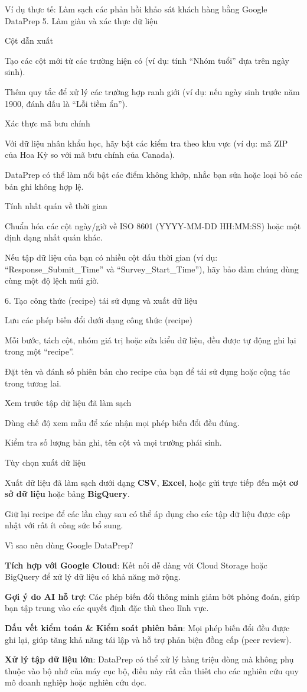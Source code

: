 \begin{examplebox}{Ví dụ thực tế: Làm sạch các phản hồi khảo sát khách hàng bằng Google DataPrep}
5. Làm giàu và xác thực dữ liệu

Cột dẫn xuất

Tạo các cột mới từ các trường hiện có (ví dụ: tính ``Nhóm tuổi'' dựa trên ngày sinh).

Thêm quy tắc để xử lý các trường hợp ranh giới (ví dụ: nếu ngày sinh trước năm 1900, đánh dấu là ``Lỗi tiềm ẩn'').

Xác thực mã bưu chính

Với dữ liệu nhân khẩu học, hãy bật các kiểm tra theo khu vực (ví dụ: mã ZIP của Hoa Kỳ so với mã bưu chính của Canada).

DataPrep có thể làm nổi bật các điểm không khớp, nhắc bạn sửa hoặc loại bỏ các bản ghi không hợp lệ.

Tính nhất quán về thời gian

Chuẩn hóa các cột ngày/giờ về ISO 8601 (YYYY-MM-DD HH:MM:SS) hoặc một định dạng nhất quán khác.

Nếu tập dữ liệu của bạn có nhiều cột dấu thời gian (ví dụ: ``Response\_Submit\_Time'' và ``Survey\_Start\_Time''), hãy bảo đảm chúng dùng cùng một độ lệch múi giờ.

6. Tạo công thức (recipe) tái sử dụng và xuất dữ liệu

Lưu các phép biến đổi dưới dạng công thức (recipe)

Mỗi bước, tách cột, nhóm giá trị hoặc sửa kiểu dữ liệu, đều được tự động ghi lại trong một ``recipe''.

Đặt tên và đánh số phiên bản cho recipe của bạn để tái sử dụng hoặc cộng tác trong tương lai.

Xem trước tập dữ liệu đã làm sạch

Dùng chế độ xem mẫu để xác nhận mọi phép biến đổi đều đúng.

Kiểm tra số lượng bản ghi, tên cột và mọi trường phái sinh.

Tùy chọn xuất dữ liệu

Xuất dữ liệu đã làm sạch dưới dạng \textbf{CSV}, \textbf{Excel}, hoặc gửi trực tiếp đến một \textbf{cơ sở dữ liệu} hoặc bảng \textbf{BigQuery}.

Giữ lại recipe để các lần chạy sau có thể áp dụng cho các tập dữ liệu được cập nhật với rất ít công sức bổ sung.

Vì sao nên dùng Google DataPrep?

\textbf{Tích hợp với Google Cloud}: Kết nối dễ dàng với Cloud Storage hoặc BigQuery để xử lý dữ liệu có khả năng mở rộng.

\textbf{Gợi ý do AI hỗ trợ}: Các phép biến đổi thông minh giảm bớt phỏng đoán, giúp bạn tập trung vào các quyết định đặc thù theo lĩnh vực.

\textbf{Dấu vết kiểm toán \& Kiểm soát phiên bản}: Mọi phép biến đổi đều được ghi lại, giúp tăng khả năng tái lập và hỗ trợ phản biện đồng cấp (peer review).

\textbf{Xử lý tập dữ liệu lớn}: DataPrep có thể xử lý hàng triệu dòng mà không phụ thuộc vào bộ nhớ của máy cục bộ, điều này rất cần thiết cho các nghiên cứu quy mô doanh nghiệp hoặc nghiên cứu dọc.

\end{examplebox}

